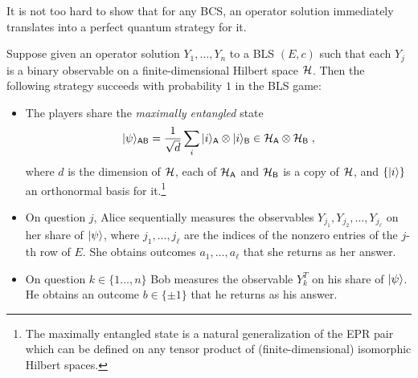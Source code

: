 It is not too hard to show that for any BCS, an operator solution immediately translates into a perfect quantum strategy for it. 

\begin{lemma}\label{lem:bcs-perfect}
Suppose given an operator solution $Y_1,\ldots,Y_n$ to a BLS $(E,c)$ such that each $Y_j$ is a binary observable on a finite-dimensional Hilbert space $\mathcal{H}$. Then the following strategy succeeds with probability $1$ in the BLS game:
\begin{itemize}
\item The players share the \emph{maximally entangled} state 
\begin{equation}\label{eq:psi-bls}
 |\psi\rangle_{{\textsf{AB}}} = \frac{1}{\sqrt{d}} \sum_{i} |i\rangle_{{\textsf{A}}} \otimes |i\rangle_{{\textsf{B}}} \in \mathcal{H}_{\textsf{A}} \otimes \mathcal{H}_{\textsf{B}}\;,
\end{equation}
 where $d$ is the dimension of $\mathcal{H}$, each of $\mathcal{H}_{\textsf{A}}$ and $\mathcal{H}_{\textsf{B}}$ is a copy of $\mathcal{H}$, and $\{|i\rangle\}$ an orthonormal basis for it.\footnote{The maximally entangled state is a natural generalization of the EPR pair which can be defined on any tensor product of (finite-dimensional) isomorphic Hilbert spaces.}
\item On question $j$, Alice sequentially measures the observables $Y_{j_1},Y_{j_2},\ldots,Y_{j_\ell}$ on her share of $|\psi\rangle$, where $j_1,\ldots,j_\ell$ are the indices of the nonzero entries of the $j$-th row of $E$. She obtains outcomes $a_1,\ldots,a_\ell$ that she returns as her answer. 
\item On question $k \in \{1\ldots,n\}$ Bob measures the observable $Y_{k}^T$ on his share of $|\psi\rangle$. He obtains an outcome $b\in\{\pm 1\}$ that he returns as his answer. 
\end{itemize}
\end{lemma}

